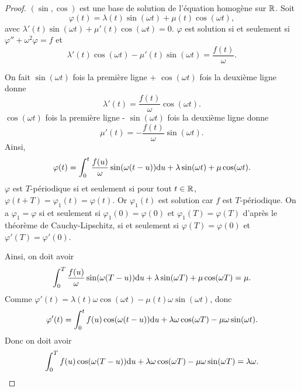 \documentclass[12pt]{article}
\begin{document}
\begin{proof}
	$(\sin,\cos)$ est une base de solution de l'équation homogène sur $\mathbb{R}$. Soit 
	\begin{equation*}
		\varphi(t)=\lambda(t)\sin(\omega t)+\mu(t)\cos(\omega t),
	\end{equation*}
	avec $\lambda'(t)\sin(\omega t)+\mu'(t)\cos(\omega t)=0$. $\varphi$ est solution si et seulement si $\varphi''+\omega^{2}\varphi=f$ et 
	\begin{equation*}
		\lambda'(t)\cos(\omega t)-\mu'(t)\sin(\omega t)=\frac{f(t)}{\omega}.
	\end{equation*}

	On fait $\sin(\omega t)$ fois la première ligne + $\cos(\omega t)$ fois la deuxième ligne donne 
	\begin{equation*}
		\lambda'(t)=\frac{f(t)}{\omega}\cos(\omega t).
	\end{equation*}
	$\cos(\omega t)$ fois la première ligne - $\sin(\omega t)$ fois la deuxième ligne donne 
	\begin{equation*}
		\mu'(t)=-\frac{f(t)}{\omega}\sin(\omega t).
	\end{equation*}
	Ainsi,
	\begin{equation*}
		\varphi(t)=\int_{0}^{t}\frac{f(u)}{\omega}\sin(\omega(t-u))\mathrm{d} u+\lambda\sin(\omega t)+\mu\cos(\omega t).
	\end{equation*}
	$\varphi$ est $T$-périodique si et seulement si pour tout $t\in\mathbb{R}$, $\varphi(t+T)=\varphi_1(t)=\varphi(t)$. Or $\varphi_1(t)$ est solution car $f$ est $T$-périodique. On a $\varphi_1=\varphi$ si et seulement si $\varphi_1(0)=\varphi(0)$ et $\varphi_1(T)=\varphi(T)$ d'après le théorème de Cauchy-Lipschitz, si et seulement si $\varphi(T)=\varphi(0)$ et $\varphi'(T)=\varphi'(0)$.

	Ainsi, on doit avoir 
	\begin{equation*}
		\int_{0}^{T}\frac{f(u)}{\omega}\sin(\omega(T-u))\mathrm{d} u+\lambda\sin(\omega T)+\mu\cos(\omega T)=\mu.
	\end{equation*}
	Comme $\varphi'(t)=\lambda(t)\omega\cos(\omega t)-\mu(t)\omega\sin(\omega t)$, donc 
	\begin{equation*}
		\varphi'(t)=\int_{0}^{t}f(u)\cos(\omega(t-u))\mathrm{d} u+\lambda\omega\cos(\omega T)-\mu\omega\sin(\omega t).
	\end{equation*}
	Donc on doit avoir 
	\begin{equation*}
		\int_{0}^{T}f(u)\cos(\omega(T-u))\mathrm{d} u+\lambda\omega\cos(\omega T)-\mu\omega\sin(\omega T)=\lambda\omega.
	\end{equation*}


\end{proof}
\end{document}
